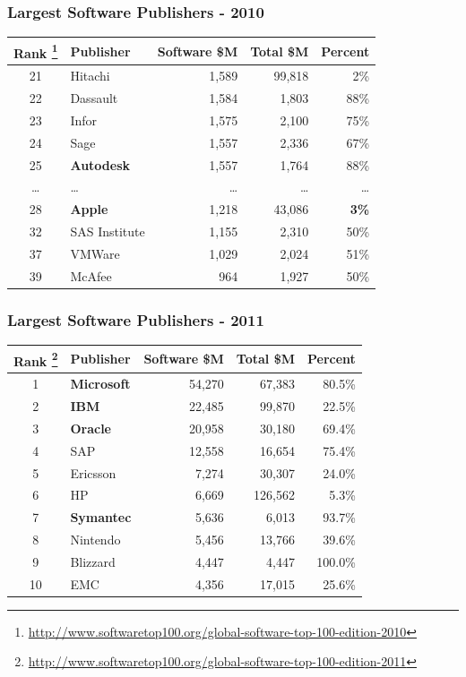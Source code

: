\documentclass[18pt]{beamer}
\begin{document}
{
\begin{frame}
\frametitle{Largest Software Publishers - 2010}

\begin{center}
\begin{tabular}{clrrr}
\hline
\textbf{Rank
\footnote{
\url{http://www.softwaretop100.org/global-software-top-100-edition-2010}}
} &\textbf{Publisher} & \textbf{Software \$M} & \textbf{Total \$M} & \textbf{Percent} \\
\hline
\hline
21 & Hitachi & 1,589 & 99,818 & 2\% \\
22 & Dassault & 1,584 & 1,803 & 88\% \\
23 & Infor & 1,575 & 2,100 & 75\% \\
24 & Sage & 1,557 & 2,336 & 67\% \\
25 & \textbf{Autodesk} & 1,557 & 1,764 & 88\% \\
\ldots & \ldots & \ldots & \ldots & \ldots \\
28 & \textbf{Apple} & 1,218 & 43,086 &  \textbf{3\%}  \\
32 & SAS Institute & 1,155  &  2,310 & 50\%  \\
37 & VMWare & 1,029 & 2,024 &  51\%  \\
39 & McAfee & 964 & 1,927 & 50\% \\
\end{tabular}

\end{center}
\end{frame}
}


{
\begin{frame}
\frametitle{Largest Software Publishers - 2011}

\begin{center}
\begin{tabular}{clrrr}
\hline
  \textbf{Rank
\footnote{
\url{http://www.softwaretop100.org/global-software-top-100-edition-2011}}
} &\textbf{Publisher} & \textbf{Software \$M} & \textbf{Total \$M} & \textbf{Percent} \\
\hline
\hline
1 &  \textbf{Microsoft} & 54,270 & 67,383 & 80.5\% \\
2 &  \textbf{IBM} & 22,485 & 99,870 & 22.5\% \\
3 &  \textbf{Oracle} & 20,958 & 30,180 & 69.4\% \\
4 &  SAP & 12,558 & 16,654 & 75.4\% \\
5 &  Ericsson & 7,274 & 30,307 & 24.0\% \\
6 &  HP & 6,669 & 126,562 & 5.3\% \\
7 &  \textbf{Symantec} & 5,636 & 6,013 & 93.7\% \\
8 &  Nintendo & 5,456 & 13,766 & 39.6\% \\
9 &  Blizzard & 4,447 & 4,447 & 100.0\% \\
10&  EMC & 4,356 & 17,015 & 25.6\% \\
\end{tabular}

\end{center}
\end{frame}
}
\end{document}
